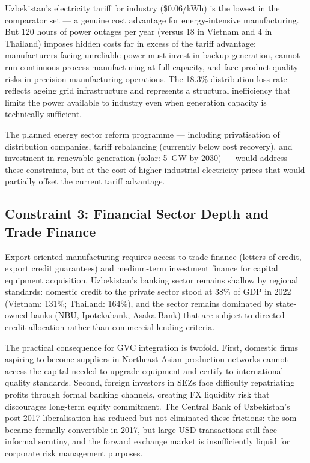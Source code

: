 Uzbekistan's electricity tariff for industry (\$0.06/kWh) is the lowest in the comparator set --- a genuine cost advantage for energy-intensive manufacturing. But 120 hours of power outages per year (versus 18 in Vietnam and 4 in Thailand) imposes hidden costs far in excess of the tariff advantage: manufacturers facing unreliable power must invest in backup generation, cannot run continuous-process manufacturing at full capacity, and face product quality risks in precision manufacturing operations. The 18.3\% distribution loss rate reflects ageing grid infrastructure and represents a structural inefficiency that limits the power available to industry even when generation capacity is technically sufficient.

The planned energy sector reform programme --- including privatisation of distribution companies, tariff rebalancing (currently below cost recovery), and investment in renewable generation (solar: 5~GW by 2030) --- would address these constraints, but at the cost of higher industrial electricity prices that would partially offset the current tariff advantage.

\subsection{Constraint 3: Financial Sector Depth and Trade Finance}

Export-oriented manufacturing requires access to trade finance (letters of credit, export credit guarantees) and medium-term investment finance for capital equipment acquisition. Uzbekistan's banking sector remains shallow by regional standards: domestic credit to the private sector stood at 38\% of GDP in 2022 (Vietnam: 131\%; Thailand: 164\%), and the sector remains dominated by state-owned banks (NBU, Ipotekabank, Asaka Bank) that are subject to directed credit allocation rather than commercial lending criteria.

The practical consequence for GVC integration is twofold. First, domestic firms aspiring to become suppliers in Northeast Asian production networks cannot access the capital needed to upgrade equipment and certify to international quality standards. Second, foreign investors in SEZs face difficulty repatriating profits through formal banking channels, creating FX liquidity risk that discourages long-term equity commitment. The Central Bank of Uzbekistan's post-2017 liberalisation has reduced but not eliminated these frictions: the som became formally convertible in 2017, but large USD transactions still face informal scrutiny, and the forward exchange market is insufficiently liquid for corporate risk management purposes.

